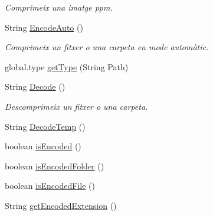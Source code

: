 \begin{DoxyCompactItemize}
\begin{DoxyCompactList}\small\item\em Comprimeix una imatge ppm. \end{DoxyCompactList}\item 
String \hyperlink{classdomini_1_1folders_1_1Ctrl__FolderFile_aa88b27fc271590c8c16642db5c1bb329}{Encode\+Auto} ()
\begin{DoxyCompactList}\small\item\em Comprimeix un fitxer o una carpeta en mode automàtic. \end{DoxyCompactList}\item 
global.\+type \hyperlink{classdomini_1_1folders_1_1Ctrl__FolderFile_a9e2ef751bdcb99083831c6b4e4761169}{get\+Type} (String Path)
\item 
String \hyperlink{classdomini_1_1folders_1_1Ctrl__FolderFile_a5d28ac7f5223ecd40a242148e86447c1}{Decode} ()
\begin{DoxyCompactList}\small\item\em Descomprimeix un fitxer o una carpeta. \end{DoxyCompactList}\item 
String \hyperlink{classdomini_1_1folders_1_1Ctrl__FolderFile_afa0f6968113855feccccfdbacc00444e}{Decode\+Temp} ()
\item 
boolean \hyperlink{classdomini_1_1folders_1_1Ctrl__FolderFile_a47a7ad955f1c579384dfba08bc7be8e0}{is\+Encoded} ()
\item 
boolean \hyperlink{classdomini_1_1folders_1_1Ctrl__FolderFile_a095e6037e5cdf9a43806a308ca028791}{is\+Encoded\+Folder} ()
\item 
boolean \hyperlink{classdomini_1_1folders_1_1Ctrl__FolderFile_a3198690e1ecc46e00431f35d87080d79}{is\+Encoded\+File} ()
\item 
String \hyperlink{classdomini_1_1folders_1_1Ctrl__FolderFile_a61d9dfde0932787a2398af3ddf99c34b}{get\+Encoded\+Extension} ()
\end{DoxyCompactItemize}
